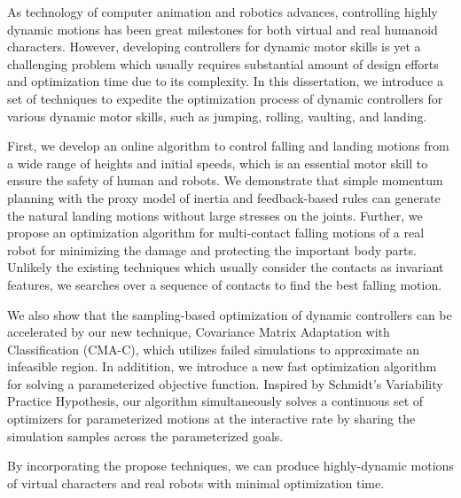 \begin{summary}
  As technology of computer animation and robotics advances,
  controlling highly dynamic motions
  has been great milestones for both virtual and real humanoid characters.
  However, developing controllers for dynamic motor skills is yet a challenging
  problem which usually requires substantial amount of design efforts and
  optimization time due to its complexity.
  In this dissertation, we introduce a set of techniques to expedite
  the optimization process of dynamic controllers for various dynamic motor 
  skills, such as jumping, rolling, vaulting, and landing.

  First, we develop an online algorithm to control falling and landing motions 
  from a wide range of heights and initial speeds,
  which is an essential motor skill to ensure the safety of human and robots.
  We demonstrate that simple momentum planning with the proxy model of inertia 
  and feedback-based rules can generate the natural landing motions
  without large stresses on the joints.
  Further, we propose an optimization algorithm for multi-contact falling
  motions of a real robot for minimizing the damage and protecting the 
  important body parts.
  Unlikely the existing techniques which usually consider the contacts as
  invariant features, we searches over a sequence of contacts to find
  the best falling motion.

  We also show that the sampling-based optimization of dynamic controllers
  can be accelerated by our new technique,
  Covariance Matrix Adaptation with Classification (CMA-C), 
  which utilizes failed simulations to approximate an infeasible region.
  In additition, we introduce a new fast optimization algorithm 
  for solving a parameterized objective function.
  Inspired by Schmidt's Variability Practice Hypothesis, 
  our algorithm simultaneously solves a continuous set of optimizers 
  for parameterized motions at the interactive rate 
  by sharing the simulation samples across the parameterized goals.

  By incorporating the propose techniques, we can produce highly-dynamic motions 
  of virtual characters and real robots with minimal optimization time.


\end{summary}
